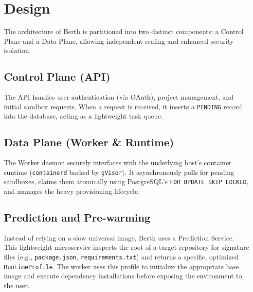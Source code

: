 \section{Design}

The architecture of Berth is partitioned into two distinct components: a Control Plane and a Data Plane, allowing independent scaling and enhanced security isolation.

\subsection{Control Plane (API)}
The API handles user authentication (via OAuth), project management, and initial sandbox requests. When a request is received, it inserts a \texttt{PENDING} record into the database, acting as a lightweight task queue.

\subsection{Data Plane (Worker \& Runtime)}
The Worker daemon securely interfaces with the underlying host's container runtime (\texttt{containerd} backed by \texttt{gVisor}). It asynchronously polls for pending sandboxes, claims them atomically using PostgreSQL's \texttt{FOR UPDATE SKIP LOCKED}, and manages the heavy provisioning lifecycle.

\subsection{Prediction and Pre-warming}
Instead of relying on a slow universal image, Berth uses a Prediction Service. This lightweight microservice inspects the root of a target repository for signature files (e.g., \texttt{package.json}, \texttt{requirements.txt}) and returns a specific, optimized \texttt{RuntimeProfile}. The worker uses this profile to initialize the appropriate base image and execute dependency installations before exposing the environment to the user.
